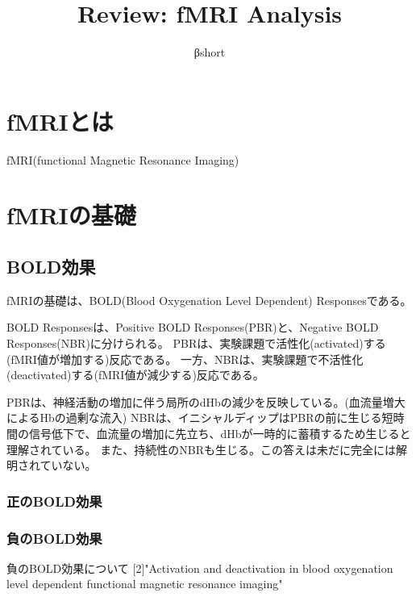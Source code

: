 \documentclass[uplatex, a4j, twocolumn]{article}
\begin{document}
\title{Review: fMRI Analysis}
\author{βshort}

\section{fMRIとは}
fMRI(functional Magnetic Resonance Imaging)

\section{fMRIの基礎}

\subsection{BOLD効果}
fMRIの基礎は、BOLD(Blood Oxygenation Level Dependent) Responsesである。

BOLD Responsesは、Positive BOLD Responses(PBR)と、Negative BOLD Responses(NBR)に分けられる。
PBRは、実験課題で活性化(activated)する(fMRI値が増加する)反応である。
一方、NBRは、実験課題で不活性化(deactivated)する(fMRI値が減少する)反応である。

PBRは、神経活動の増加に伴う局所のdHbの減少を反映している。(血流量増大によるHbの過剰な流入)
NBRは、イニシャルディップはPBRの前に生じる短時間の信号低下で、血流量の増加に先立ち、dHbが一時的に蓄積するため生じると理解されている。
また、持続性のNBRも生じる。この答えは未だに完全には解明されていない。
\subsubsection{正のBOLD効果}
\subsubsection{負のBOLD効果}
負のBOLD効果について
[2]"Activation and deactivation in blood oxygenation level dependent functional magnetic resonance imaging"
\end{document}
